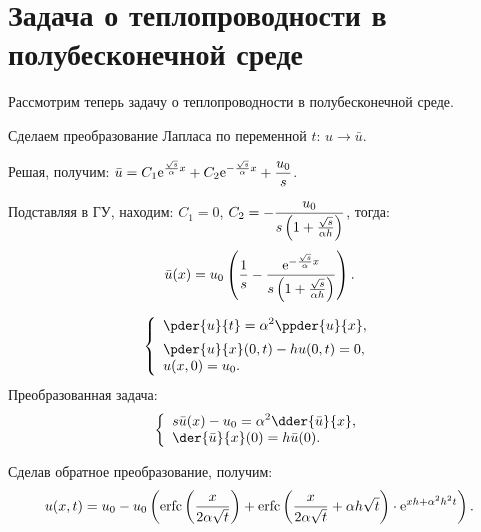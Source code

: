 \section{Задача о теплопроводности в полубесконечной среде}
\begin{minipage}{.6\textwidth}
    Рассмотрим теперь задачу о теплопроводности в полубесконечной среде.

    Сделаем преобразование Лапласа по переменной \( t \): \( u \to \bar{u} \).
        
    Решая, получим: \( \displaystyle \bar{u} = C_1\mathrm{e}^{\frac{\sqrt{s}}{\alpha}x} +
    C_2\mathrm{e}^{-\frac{\sqrt{s}}{\alpha}x} + \frac{u_0}{s} \).

    Подставляя в ГУ, находим: \( C_1 = 0 \), \( \displaystyle C_2 =
    -\frac{u_0}{s\left(1 + \frac{\sqrt{s}}{\alpha h}\right)} \), тогда:
    \[
        \bar{u}(x) = u_0\left(\frac{1}{s} - \frac{\mathrm{e}^{-\frac{\sqrt{s}}
        {\alpha}x}}{s\left(1 + \frac{\sqrt{s}}{\alpha h}\right)}\right).
    \]
\end{minipage}
\hfill
\begin{minipage}{.3\textwidth}
    \flushright
    \[
        \left\{ \begin{array}{l}
            \ds \pder{u}{t} = \alpha^2 \ppder{u}{x}, \\[.5em]
            \ds \pder{u}{x}(0,t) - hu(0, t) = 0, \\
            u(x, 0) = u_0.
        \end{array} \right.
    \]
    Преобразованная задача:
    \[
        \left\{ \begin{array}{l}
            \ds s\bar{u}(x) - u_0 = \alpha^2\dder{\bar{u}}{x}, \\
            \ds \der{\bar{u}}{x}(0) = h\bar{u}(0).
        \end{array} \right.
    \]
\end{minipage}

Сделав обратное преобразование, получим:
\[
    u(x, t) = u_0 - u_0\left(\mathrm{erfc}\left(\frac{x}{2\alpha\sqrt{t}}\right) + 
    \mathrm{erfc}\left(\frac{x}{2\alpha\sqrt{t}} + \alpha h\sqrt{t}\right)\cdot
    \mathrm{e}^{xh + \alpha^2h^2 t}\right).
\]

\newpage
